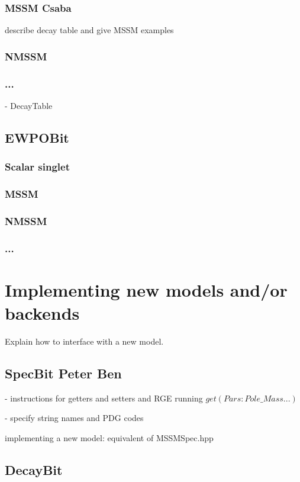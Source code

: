 \documentclass[11pt,a4paper]{article}
\newcommand{\Ben}[1]{{\bf\color{magenta}Ben #1}}
\newcommand{\Csaba}[1]{{\bf\color{orange}Csaba #1}}
\newcommand{\Peter}[1]{{\bf\color{green}Peter #1}}
\begin{document}
\subsubsection{MSSM \Csaba{}}

describe decay table and give MSSM examples

\subsubsection{NMSSM}
\subsubsection{...}

- DecayTable

\subsection{EWPOBit}
\subsubsection{Scalar singlet}
\subsubsection{MSSM}
\subsubsection{NMSSM}
\subsubsection{...}
 

\section{Implementing new models and/or backends}

Explain how to interface with a new model.

\subsection{SpecBit \Peter{} \Ben{}}

- instructions for getters and setters and RGE running
$get(Pars:Pole\_Mass...)$

- specify string names and PDG codes

implementing a new model: equivalent of MSSMSpec.hpp


\subsection{DecayBit}
\end{document}
